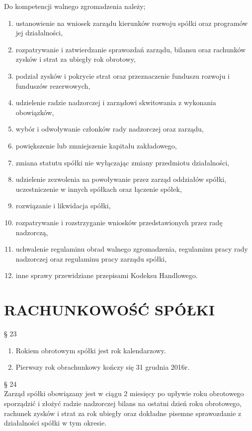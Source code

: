 \documentclass[a4paper, 11pt]{article}
\begin{document}
Do kompetencji walnego zgromadzenia należy;
\begin{enumerate}
\item ustanowienie na wniosek zarządu kierunków rozwoju spółki oraz programów jej działalności,
\item	rozpatrywanie i zatwierdzanie sprawozdań zarządu, bilansu oraz rachunków zysków i strat za ubiegły rok obrotowy,
\item	podział zysków i pokrycie strat oraz przeznaczenie funduszu rozwoju i funduszów rezerwowych,
\item	udzielenie radzie nadzorczej i zarządowi skwitowania z wykonania obowiązków,
\item	wybór i odwoływanie członków rady nadzorczej oraz zarządu,
\item	powiększenie lub zmniejszenie kapitału zakładowego,
\item	zmiana statutu spółki nie wyłączając zmiany przedmiotu działalności,
\item	udzielenie zezwolenia na powoływanie przez zarząd oddziałów spółki, uczestniczenie w innych spółkach oraz łączenie spółek,
\item	rozwiązanie i likwidacja spółki,
\item	rozpatrywanie i rozstrzyganie wniosków przedstawionych przez radę nadzorczą,
\item	uchwalenie regulaminu obrad walnego zgromadzenia, regulaminu pracy rady nadzorczej oraz regulaminu pracy zarządu spółki,
\item	inne sprawy przewidziane przepisami Kodeksu Handlowego.
\end{enumerate}


\section{RACHUNKOWOŚĆ SPÓŁKI}
 
	 § 23\\

\begin{enumerate}
\item	Rokiem obrotowym spółki jest rok kalendarzowy.
\item	Pierwszy rok obrachunkowy kończy się 31 grudnia 2016r.
\end{enumerate}


§ 24\\

Zarząd spółki obowiązany jest w ciągu 2 miesięcy po upływie roku obrotowego sporządzić i złożyć radzie nadzorczej bilans na ostatni dzień roku obrotowego, rachunek zysków i strat za rok ubiegły oraz dokładne pisemne sprawozdanie z działalności spółki w tym okresie.\\ 
\end{document}
